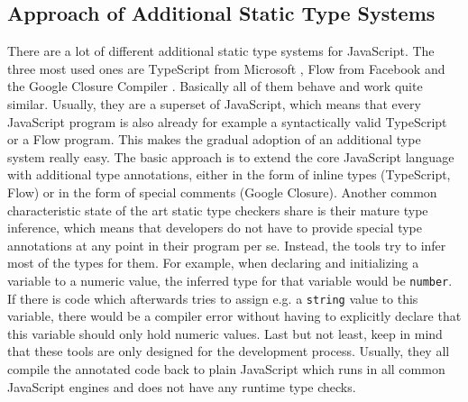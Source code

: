 \documentclass[runningheads,a4paper]{llncs}
\begin{document}
\subsection{Approach of Additional Static Type Systems} \label{staticTypeSystems}
There are a lot of different additional static type systems for JavaScript.
The three most used ones are TypeScript from Microsoft \cite{TypeScript}, Flow from Facebook \cite{Flow} and the Google Closure Compiler \cite{ClosureComiler}.
Basically all of them behave and work quite similar.
Usually, they are a superset of JavaScript, which means that every JavaScript program is also already for example a syntactically valid TypeScript or a Flow program.
This makes the gradual adoption of an additional type system really easy.
The basic approach is to extend the core JavaScript language with additional type annotations, either in the form of inline types (TypeScript, Flow) or in the form of special comments (Google Closure).
Another common characteristic state of the art static type checkers share is their mature type inference, which means that developers do not have to provide special type annotations at any point in their program per se.
Instead, the tools try to infer most of the types for them. 
For example, when declaring and initializing a variable to a numeric value, the inferred type for that variable would be \lstinline[columns=fixed]{number}.
If there is code which afterwards tries to assign e.g. a \lstinline[columns=fixed]{string} value to this variable, there would be a compiler error without having to explicitly declare that this variable should only hold numeric values.
Last but not least, keep in mind that these tools are only designed for the development process.
Usually, they all compile the annotated code back to plain JavaScript which runs in all common JavaScript engines and does not have any runtime type checks.
\end{document}
